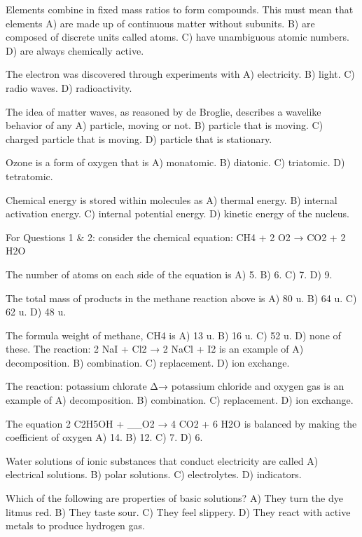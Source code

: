Elements combine in fixed mass ratios to form compounds. This must mean that elements
    A)  are made up of continuous matter without subunits.
    B)  are composed of discrete units called atoms.
    C)  have unambiguous atomic numbers.
    D)  are always chemically active.

The electron was discovered through experiments with
    A)  electricity.
    B)  light.
    C)  radio waves.
    D)  radioactivity.

The idea of matter waves, as reasoned by de Broglie, describes a wavelike behavior of any
    A)  particle, moving or not.
    B)  particle that is moving.
    C)  charged particle that is moving.
    D)  particle that is stationary.

Ozone is a form of oxygen that is
    A)  monatomic.
    B)  diatonic.
    C)  triatomic.
    D)  tetratomic.

Chemical energy is stored within molecules as
    A)  thermal energy.
    B)  internal activation energy.
    C)  internal potential energy.
    D)  kinetic energy of the nucleus.



For Questions 1 & 2: consider the chemical equation: CH4 + 2 O2 → CO2 + 2 H2O

The number of atoms on each side of the equation is
    A)  5.
    B)  6.
    C)  7.
    D)  9.

The total mass of products in the methane reaction above is
    A)  80 u.
    B)  64 u.
    C)  62 u.
    D)  48 u.

The formula weight of methane, CH4 is
    A)  13 u.
    B)  16 u.
    C)  52 u.
    D)  none of these.
The reaction: 2 NaI + Cl2 → 2 NaCl + I2 is an example of
    A)  decomposition.
    B)  combination.
    C)  replacement.
    D)  ion exchange.

The reaction: potassium chlorate Δ→ potassium chloride and oxygen gas is an example of
    A)  decomposition.
    B)  combination.
    C)  replacement.
    D)  ion exchange.

The equation 2 C2H5OH + __O2 → 4 CO2 + 6 H2O is balanced by making the coefficient of oxygen
    A)  14.
    B)  12.
    C)  7.
    D)  6.

Water solutions of ionic substances that conduct electricity are called
    A)  electrical solutions.
    B)  polar solutions.
    C)  electrolytes.
    D)  indicators.

Which of the following are properties of basic solutions?
    A)  They turn the dye litmus red.
    B)  They taste sour.
    C)  They feel slippery.
    D)  They react with active metals to produce hydrogen gas.

